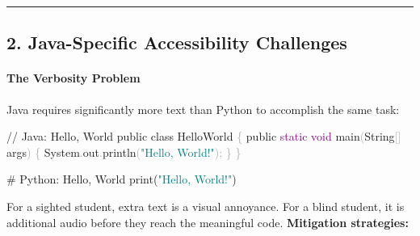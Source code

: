 \documentclass[
  justified,
  openright,
]{tufte-book}
\let\subsubsection\paragraph
\let\paragraph\paragraph
\newcommand{\BuiltInTok}[1]{#1}
\newcommand{\CommentTok}[1]{\textcolor{MidGray}{#1}}
\newcommand{\DataTypeTok}[1]{\textcolor{Purple}{#1}}
\newcommand{\FunctionTok}[1]{\textcolor{BrandBlue}{#1}}
\newcommand{\KeywordTok}[1]{\textcolor{BrandBlue}{#1}}
\newcommand{\NormalTok}[1]{#1}
\newcommand{\OperatorTok}[1]{\textcolor{DarkGray}{#1}}
\newcommand{\StringTok}[1]{\textcolor{Teal}{#1}}
\newenvironment{Shaded}{%
  \begin{snugshade}
}{%
  \end{snugshade}
}
\let\subsubsection\paragraph
\let\paragraph\paragraph
\begin{document}
\begin{center}\rule{0.5\linewidth}{0.5pt}\end{center}

\subsection{2. Java-Specific Accessibility
Challenges}\label{java-specific-accessibility-challenges}

\subsubsection{The Verbosity Problem}\label{the-verbosity-problem}

Java requires significantly more text than Python to accomplish the same
task:

\begin{Shaded}
\begin{Highlighting}[]
\CommentTok{// Java: Hello, World}
\KeywordTok{public} \KeywordTok{class}\NormalTok{ HelloWorld }\OperatorTok{\{}
    \KeywordTok{public} \DataTypeTok{static} \DataTypeTok{void} \FunctionTok{main}\OperatorTok{(}\BuiltInTok{String}\OperatorTok{[]}\NormalTok{ args}\OperatorTok{)} \OperatorTok{\{}
        \BuiltInTok{System}\OperatorTok{.}\FunctionTok{out}\OperatorTok{.}\FunctionTok{println}\OperatorTok{(}\StringTok{"Hello, World!"}\OperatorTok{);}
    \OperatorTok{\}}
\OperatorTok{\}}
\end{Highlighting}
\end{Shaded}

\begin{Shaded}
\begin{Highlighting}[]
\CommentTok{\# Python: Hello, World}
\BuiltInTok{print}\NormalTok{(}\StringTok{"Hello, World!"}\NormalTok{)}
\end{Highlighting}
\end{Shaded}

For a sighted student, extra text is a visual annoyance. For a blind
student, it is additional audio before they reach the meaningful code.
\textbf{Mitigation strategies:}
\end{document}
